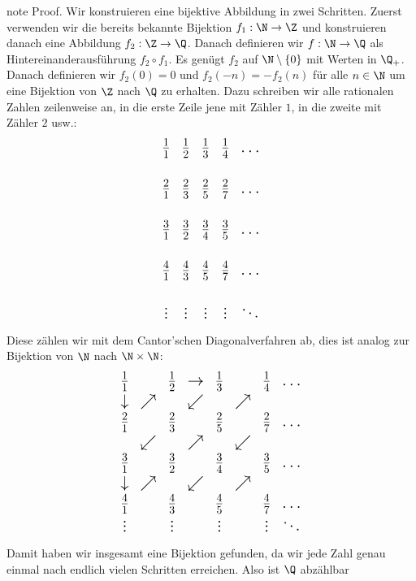 \documentclass[letterpaper,10pt,english]{jupyterBook}
\begin{document}
\begin{sphinxadmonition}{note}
Proof.  Wir konstruieren eine bijektive Abbildung in zwei Schritten. Zuerst verwenden wir die bereits bekannte Bijektion \(f_1 : \N \rightarrow \Z\) und konstruieren danach eine Abbildung \(f_2: \Z \rightarrow \Q\). Danach definieren wir \(f: \N \rightarrow \Q\) als Hintereinanderausführung \(f_2 \circ f_1\).
Es genügt \(f_2\) auf \(\N \setminus \{0\}\) mit Werten in \(\Q_+\). Danach definieren wir \(f_2(0)=0\) und \(f_2(-n)=-f_2(n)\) für alle \(n \in \N\) um eine Bijektion von \(\Z\) nach \(\Q\) zu erhalten. Dazu schreiben wir alle rationalen Zahlen zeilenweise an, in die erste Zeile jene mit Zähler \(1\), in die zweite mit Zähler \(2\) usw.:
\begin{equation*}
\begin{split}{\Large 
\begin{matrix}  
\frac{1}1 & \frac{1}2 & \frac{1}3 & \frac{1}4 & \ldots  \\
& & & &\\
\frac{2}1 & \frac{2}3 & \frac{2}5 & \frac{2}7 & \ldots \\
& & & &\\
\frac{3}1 & \frac{3}2 & \frac{3}4 & \frac{3}5 & \ldots \\
& & & &\\
\frac{4}1 & \frac{4}3 & \frac{4}5 & \frac{4}7 & \ldots \\
& & & &\\
\vdots & \vdots & \vdots & \vdots & \ddots
\end{matrix}}\end{split}
\end{equation*}
Diese zählen wir mit dem Cantor’schen Diagonalverfahren ab, dies ist analog zur Bijektion von \(\N\) nach \(\N \times \N\):
\begin{equation*}
\begin{split}{\Large 
 \begin{matrix}    
\frac{1}1 & & \frac{1}2 & \rightarrow &\frac{1}3 & &\frac{1}4 & \ldots  \\
\downarrow & \nearrow & & \swarrow  & & \nearrow & & \\
\frac{2}1 & &\frac{2}3 & &\frac{2}5 & &\frac{2}7 & \ldots \\
& \swarrow & & \nearrow&&  \swarrow & & \\
\frac{3}1 & &\frac{3}2 & &\frac{3}4 & &\frac{3}5 & \ldots \\
\downarrow & \nearrow & & \swarrow  & & \nearrow & & \\
\frac{4}1 & &\frac{4}3 & &\frac{4}5 & &\frac{4}7 & \ldots \\
\vdots & &\vdots & &\vdots & & \vdots & \ddots
\end{matrix}}\end{split}
\end{equation*}
Damit haben wir insgesamt eine Bijektion gefunden, da wir jede Zahl genau einmal nach endlich vielen Schritten erreichen. Also ist \(\Q\) abzählbar
\end{sphinxadmonition}
\end{document}
